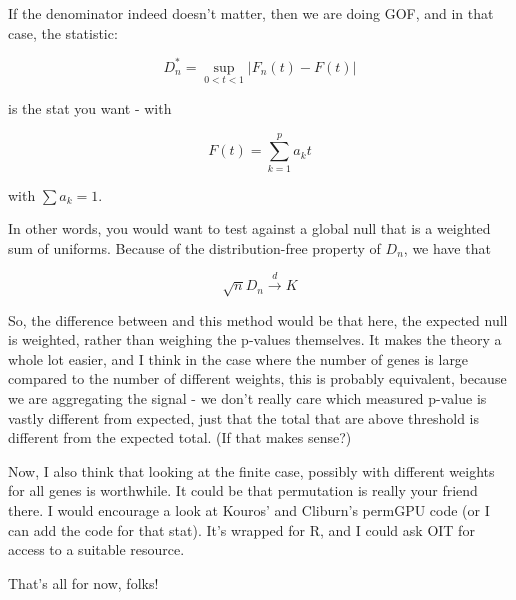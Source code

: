 \documentclass[11pt]{article}
\begin{document}
If the denominator indeed doesn't matter, then we are doing GOF, and in that case, the statistic:

$$D^*_n = \sup_{0<t<1}\left|F_n(t) - F(t)|$$

is the stat you want - with 

$$F(t) = \sum_{k=1}^p a_k t$$

with $\sum a_k = 1$.

In other words, you would want to test against a global null that is a weighted sum of uniforms. Because of the distribution-free property of $D_n$, we have that

$$\sqrt{n}D_n\xrightarrow{d} K$$

So, the difference between \cite{KSGene} and this method would be that here, the expected null is weighted, rather than weighing the p-values themselves. It makes the theory a whole lot easier, and I think in the case where the number of genes is large compared to the number of different weights, this is probably equivalent, because we are aggregating the signal - we don't really care which measured p-value is vastly different from expected, just that the total that are above threshold is different from the expected total. (If that makes sense?) 

Now, I also think that looking at the finite case, possibly with different weights for all genes is worthwhile. It could be that permutation is really your friend there. I would encourage a look at Kouros' and Cliburn's permGPU code (or I can add the code for that stat). It's wrapped for R, and I could ask OIT for access to a suitable resource.

That's all for now, folks!





\end{document}
